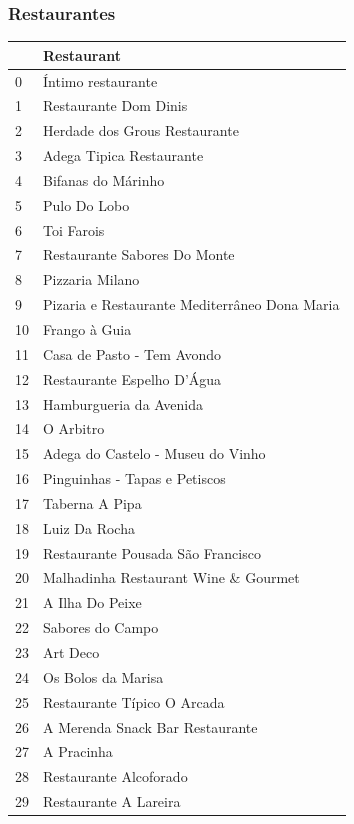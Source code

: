 \documentclass[a4paper,10pt]{article}
\begin{document}
\newpage

\subsubsection{Restaurantes}

\begin{table}[!ht]
  \centering
  \begin{tabular}{|l|l|}
  \hline
      ~ & Restaurant \\ \hline
      0 & Íntimo restaurante \\ \hline
      1 & Restaurante Dom Dinis \\ \hline
      2 & Herdade dos Grous Restaurante \\ \hline
      3 & Adega Tipica Restaurante \\ \hline
      4 & Bifanas do Márinho \\ \hline
      5 & Pulo Do Lobo \\ \hline
      6 & Toi Farois \\ \hline
      7 & Restaurante Sabores Do Monte \\ \hline
      8 & Pizzaria Milano \\ \hline
      9 & Pizaria e Restaurante Mediterrâneo Dona Maria \\ \hline
      10 & Frango à Guia \\ \hline
      11 & Casa de Pasto - Tem Avondo \\ \hline
      12 & Restaurante Espelho D'Água \\ \hline
      13 & Hamburgueria da Avenida \\ \hline
      14 & O Arbitro \\ \hline
      15 & Adega do Castelo - Museu do Vinho \\ \hline
      16 & Pinguinhas - Tapas e Petiscos \\ \hline
      17 & Taberna A Pipa \\ \hline
      18 & Luiz Da Rocha \\ \hline
      19 & Restaurante Pousada São Francisco \\ \hline
      20 & Malhadinha Restaurant Wine \& Gourmet \\ \hline
      21 & A Ilha Do Peixe \\ \hline
      22 & Sabores do Campo \\ \hline
      23 & Art Deco \\ \hline
      24 & Os Bolos da Marisa \\ \hline
      25 & Restaurante Típico O Arcada \\ \hline
      26 & A Merenda Snack Bar Restaurante \\ \hline
      27 & A Pracinha \\ \hline
      28 & Restaurante Alcoforado \\ \hline
      29 & Restaurante A Lareira \\ \hline
  \end{tabular}
\end{table}
\end{document}
